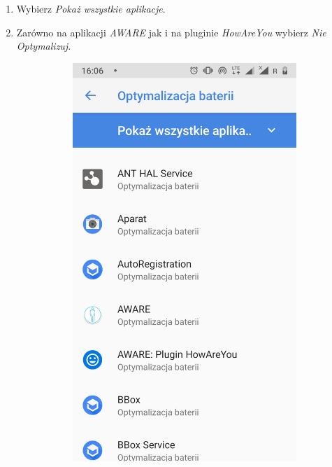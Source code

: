 \begin{enumerate}
	\item Wybierz \textit{Pokaż wszystkie aplikacje}.
	
	\item Zarówno na aplikacji \textit{AWARE} jak i na pluginie \textit{HowAreYou} wybierz \textit{Nie Optymalizuj}.
	
	\begin{figure}[H]
		\centering
		\begin{subfigure}{0.35\textwidth}
			\centering
			\includegraphics[scale=0.14]{dodatekA/3_9.png}

\end{subfigure}
\end{figure}
\end{enumerate}
